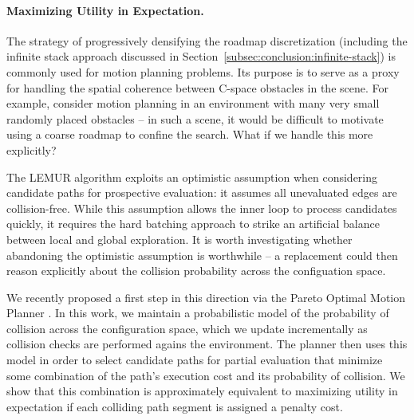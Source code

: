 
\paragraph{Maximizing Utility in Expectation.}
The strategy of progressively densifying the roadmap discretization
(including the infinite stack approach discussed
in Section~\ref{subsec:conclusion:infinite-stack})
is commonly used for motion planning problems.
Its purpose is to serve as a proxy for handling the spatial coherence
between C-space obstacles in the scene.
For example,
consider motion planning in an environment with many very small
randomly placed obstacles --
in such a scene, it would be difficult to motivate using a coarse
roadmap to confine the search.
What if we handle this more explicitly?

The LEMUR algorithm exploits an optimistic assumption when considering
candidate paths for prospective evaluation:
it assumes all unevaluated edges are collision-free.
While this assumption allows the inner loop to process candidates
quickly,
it requires the hard batching approach to strike an artificial
balance between local and global exploration.
It is worth investigating whether abandoning the optimistic
assumption is worthwhile --
a replacement could then reason explicitly about the collision
probability across the configuation space.

We recently proposed a first step in this direction
via the Pareto Optimal Motion Planner \citep{choudhury2016pomp}.
In this work,
we maintain a probabilistic model of the probability of collision
across the configuration space,
which we update incrementally as collision checks are performed
agains the environment.
The planner then uses this model in order to select candidate paths
for partial evaluation that minimize some combination of the path's
execution cost and its probability of collision.
We show that this combination is approximately equivalent
to maximizing utility in expectation
if each colliding path segment is assigned a penalty cost.

